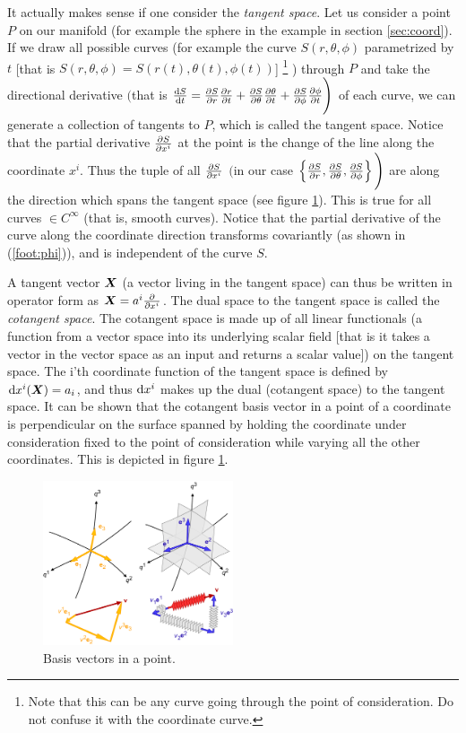 \documentclass[a4paper, 12pt]{article}
\begin{document}
It actually makes sense if one consider the \emph{tangent space}. Let us
consider a point $P$ on our manifold (for example the sphere in the example in
section \ref{sec:coord}). If we draw all possible curves (for example
the curve $S(r,\theta,\phi)$ parametrized by $t$ [that is
$S(r,\theta,\phi) = S(r(t),\theta(t),\phi(t))$]%
%
\footnote{\label{note:curve}Note that this can be any curve going through the
          point of consideration. Do not confuse it with the coordinate curve.}%
%
) through $P$ and take the directional derivative $\Bigg($that is $\frac{\text{d}{S}}{\text{d}{t}}
=
\frac{\partial {S}}{\partial{r}}\frac{\partial {r}}{\partial{t}} + \frac{\partial {S}}{\partial{\theta}}\frac{\partial {\theta}}{\partial{t}} +
\frac{\partial {S}}{\partial{\phi}}\frac{\partial {\phi}}{\partial{t}}\Bigg)$ of each curve, we can generate a
collection of tangents to $P$, which is called the tangent space. Notice that
the partial derivative $\frac{\partial {S}}{\partial{x^i}}$ at the point is the change of the line
along the coordinate $x^i$. Thus the tuple of all $\frac{\partial {S}}{\partial{x^i}}$ $\Bigg($in
our case $\left\{\frac{\partial {S}}{\partial{r}}, \frac{\partial {S}}{\partial{\theta}}, \frac{\partial {S}}{\partial{\phi}}\right\} \Bigg)$ are
along the direction which spans the tangent space (see figure \ref{fig:basis}).
This is true for all curves $\in C^{\infty}$ (that is, smooth curves). Notice
that the partial derivative of the curve along the coordinate direction
transforms covariantly (as shown in (\ref{foot:phi})), and is independent of
the
curve $S$.

A tangent vector $\boldsymbol{X}$ (a vector living in the tangent space) can thus be
written in operator form as $\boldsymbol{X}=a^i\frac{\partial {}}{\partial{x^{i}}}$. The dual space to
the tangent space is called the \emph{cotangent space}. The cotangent space is
made up of all linear functionals (a function from a vector space into its
underlying scalar field [that is it takes a vector in the vector space as an
input and returns a scalar value]) on the tangent space. The i'th coordinate
function of the tangent space is defined by $\text{d} x^i(\boldsymbol{X}) = a_i$, and thus
$\text{d}
x^i$ makes up the dual (cotangent space) to the tangent space. It can be shown
that the cotangent basis vector in a point of a coordinate is perpendicular on
the surface spanned by holding the coordinate under consideration fixed to the
point of consideration while varying all the other coordinates. This is
depicted
in figure \ref{fig:basis}.
%
\begin{figure}[h!]
\center
 \includegraphics[width=0.5\textwidth]{figures/co-contra}
 \caption{Basis vectors in a point.}
 \label{fig:basis}
\end{figure}
\end{document}
